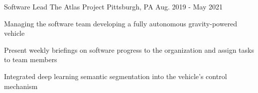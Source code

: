 

\begin{cventries}

  \cventry
    {Software Lead} %
    {The Atlas Project} %
    {Pittsburgh, PA} %
    {Aug. 2019 - May 2021} %
    {
      \begin{cvitems} %
		\item Managing the software team developing a fully autonomous gravity-powered vehicle
		\item Present weekly briefings on software progress to the organization and assign tasks to team members
		\item Integrated deep learning semantic segmentation into the vehicle's control mechanism
      \end{cvitems}
    }

\end{cventries}
